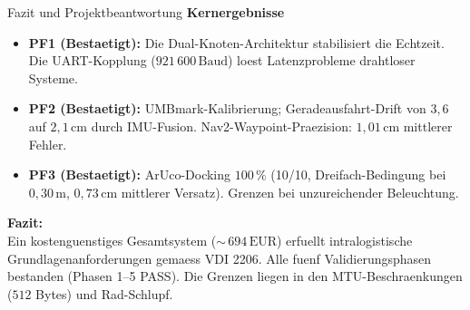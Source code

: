 \documentclass[aspectratio=169]{beamer}
\begin{document}
\begin{frame}{Fazit und Projektbeantwortung}
  \textbf{Kernergebnisse}
  \begin{itemize}
    \item \textbf{PF1 (Bestaetigt):} Die Dual-Knoten-Architektur stabilisiert die Echtzeit. Die UART-Kopplung ($921\,600\,\mathrm{Baud}$) loest Latenzprobleme drahtloser Systeme.
    \item \textbf{PF2 (Bestaetigt):} UMBmark-Kalibrierung; Geradeausfahrt-Drift von $3{,}6$ auf $2{,}1\,\mathrm{cm}$ durch IMU-Fusion. Nav2-Waypoint-Praezision: $1{,}01\,\mathrm{cm}$ mittlerer Fehler.
    \item \textbf{PF3 (Bestaetigt):} ArUco-Docking $100\,\%$ (10/10, Dreifach-Bedingung bei $0{,}30\,\mathrm{m}$, $0{,}73\,\mathrm{cm}$ mittlerer Versatz). Grenzen bei unzureichender Beleuchtung.
  \end{itemize}

  \vspace{0.8em}
  \textbf{Fazit:}\\
  Ein kostenguenstiges Gesamtsystem (${\sim}\,694\,\mathrm{EUR}$) erfuellt intralogistische Grundlagenanforderungen gemaess VDI 2206. Alle fuenf Validierungsphasen bestanden (Phasen 1--5 PASS). Die Grenzen liegen in den MTU-Beschraenkungen ($512$ Bytes) und Rad-Schlupf.
\end{frame}
\end{document}
